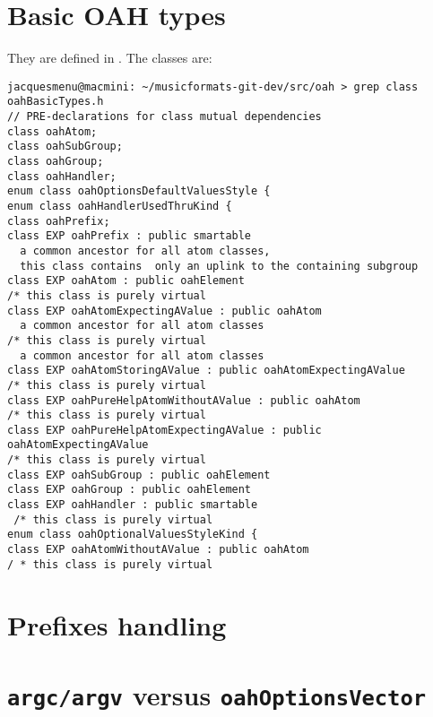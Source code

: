 \section{Basic OAH types}

They are defined in . The classes are:
\begin{lstlisting}[language=Terminal]
jacquesmenu@macmini: ~/musicformats-git-dev/src/oah > grep class oahBasicTypes.h
// PRE-declarations for class mutual dependencies
class oahAtom;
class oahSubGroup;
class oahGroup;
class oahHandler;
enum class oahOptionsDefaultValuesStyle {
enum class oahHandlerUsedThruKind {
class oahPrefix;
class EXP oahPrefix : public smartable
  a common ancestor for all atom classes,
  this class contains  only an uplink to the containing subgroup
class EXP oahAtom : public oahElement
/* this class is purely virtual
class EXP oahAtomExpectingAValue : public oahAtom
  a common ancestor for all atom classes
/* this class is purely virtual
  a common ancestor for all atom classes
class EXP oahAtomStoringAValue : public oahAtomExpectingAValue
/* this class is purely virtual
class EXP oahPureHelpAtomWithoutAValue : public oahAtom
/* this class is purely virtual
class EXP oahPureHelpAtomExpectingAValue : public oahAtomExpectingAValue
/* this class is purely virtual
class EXP oahSubGroup : public oahElement
class EXP oahGroup : public oahElement
class EXP oahHandler : public smartable
 /* this class is purely virtual
enum class oahOptionalValuesStyleKind {
class EXP oahAtomWithoutAValue : public oahAtom
/ * this class is purely virtual
\end{lstlisting}


\section{Prefixes handling}


\section{{\tt argc/argv} versus {\tt oahOptionsVector}}

